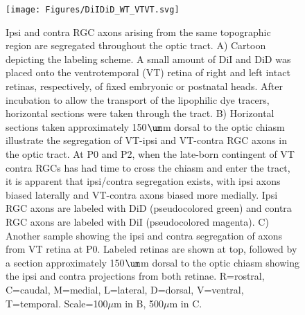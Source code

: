 \begin{figure}[hbtp]
	\begin{center}
		\texttt{[image: Figures/DiIDiD\_WT\_VTVT.svg]}
		\caption[Ipsi and contra RGC axons arising from the same topographic region are segregated throughout the optic tract.]
		{Ipsi and contra RGC axons arising from the same topographic region are segregated throughout the optic tract.
		A) Cartoon depicting the labeling scheme.
		A small amount of DiI and DiD was placed onto the ventrotemporal (VT) retina of right and left intact retinas, respectively, of fixed embryonic or postnatal heads.
		After incubation to allow the transport of the lipophilic dye tracers, horizontal sections were taken through the tract.
		B) Horizontal sections taken approximately 150$\um$m dorsal to the optic chiasm illustrate the segregation of VT-ipsi and VT-contra RGC axons in the optic tract.
		At P0 and P2, when the late-born contingent of VT contra RGCs has had time to cross the chiasm and enter the tract, it is apparent that ipsi/contra segregation exists, with ipsi axons biased laterally and VT-contra axons biased more medially.
		Ipsi RGC axons are labeled with DiD (pseudocolored green) and contra RGC axons are labeled with DiI (pseudocolored magenta).
		C) Another sample showing the ipsi and contra segregation of axons from VT retina at P0.
		Labeled retinas are shown at top, followed by a section approximately 150$\um$m dorsal to the optic chiasm showing the ipsi and contra projections from both retinae.
		R=rostral, C=caudal, M=medial, L=lateral, D=dorsal, V=ventral, T=temporal. Scale=100$\mu$m in B, 500$\mu$m in C.}		
		\label{Figures/DiIDiD_WT_VTVT}
	\end{center}
\end{figure}